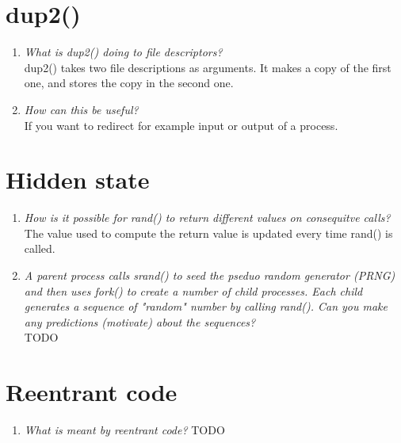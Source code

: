 \documentclass[a4paper]{article}
\begin{document}
\section{dup2()}
\begin{enumerate}
  \item \textit{What is dup2() doing to file descriptors?} \\
    dup2() takes two file descriptions as arguments. It makes a copy of the first one, and stores the copy in the second one. 
  \item \textit{How can this be useful?} \\
    If you want to redirect for example input or output of a process. 
\end{enumerate}

\section{Hidden state}
\begin{enumerate} 
  \item \textit{ How is it possible for rand() to return different values on consequitve calls?} \\
    The value used to compute the return value is updated every time rand() is called. 
  \item \textit{A parent process calls srand() to seed the pseduo random generator (PRNG) and then uses fork() to create a number of child processes. Each child generates a sequence of "random" number by calling rand(). Can you make any predictions (motivate) about the sequences?} \\
    {\color{read} TODO}
    
  
\end{enumerate}

\section{Reentrant code}
\begin{enumerate}
\item \textit{What is meant by reentrant code?}
      {\color{read} TODO}
\end{enumerate}
\end{document}
